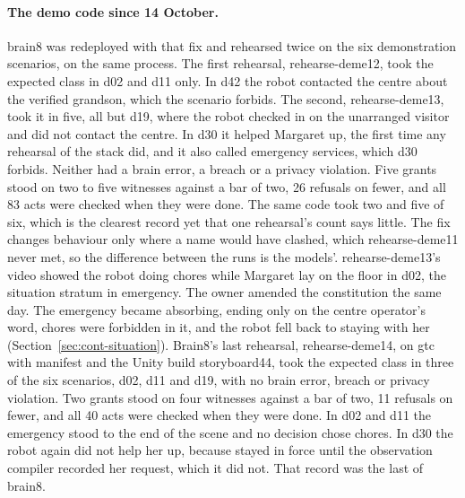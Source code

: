 \paragraph{The demo code since 14 October.} brain8 was redeployed with that fix and rehearsed
twice on the six demonstration scenarios, on the same process. The first rehearsal, rehearse-deme12,
took the expected class in d02 and d11 only. In d42 the robot contacted the centre about the
verified grandson, which the scenario forbids. The second, rehearse-deme13, took it in five, all but
d19, where the robot checked in on the unarranged visitor and did not contact the centre. In d30 it
helped Margaret up, the first time any rehearsal of the stack did, and it also called emergency
services, which d30 forbids. Neither had a brain error, a breach or a privacy violation. Five grants
stood on two to five witnesses against a bar of two, 26 refusals on fewer, and all 83 acts were
checked when they were done. The same code took two and five of six, which is the clearest record
yet that one rehearsal's count says little. The fix changes behaviour only where a name would have
clashed, which rehearse-deme11 never met, so the difference between the runs is the models'.
rehearse-deme13's video showed the robot doing chores while Margaret lay on the floor in d02, the
situation stratum in emergency. The owner amended the constitution the same day. The emergency
became absorbing, ending only on the centre operator's word, chores were forbidden in it, and the
robot fell back to staying with her (Section~\ref{sec:cont-situation}). Brain8's last rehearsal,
rehearse-deme14, on gtc  with manifest  and the Unity build storyboard44,
took the expected class in three of the six scenarios, d02, d11 and d19, with no brain error, breach
or privacy violation. Two grants stood on four witnesses against a bar of two, 11 refusals on fewer,
and all 40 acts were checked when they were done. In d02 and d11 the emergency stood to the end of
the scene and no decision chose chores. In d30 the robot again did not help her up, because
 stayed in force until the observation compiler recorded her request, which it did
not. That record was the last of brain8.

